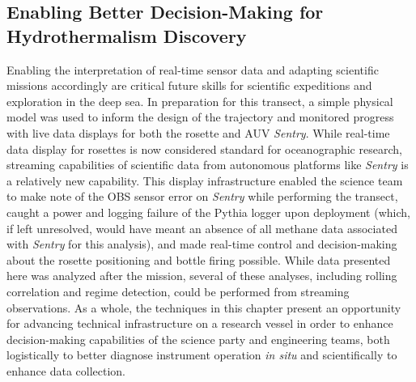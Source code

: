 \subsection{Enabling Better Decision-Making for Hydrothermalism Discovery}
Enabling the interpretation of real-time sensor data and adapting scientific missions accordingly are critical future skills for scientific expeditions and exploration in the deep sea. In preparation for this transect, a simple physical model was used to inform the design of the trajectory and monitored progress with live data displays for both the rosette and AUV \emph{Sentry}. While real-time data display for rosettes is now considered standard for oceanographic research, streaming capabilities of scientific data from autonomous platforms like \emph{Sentry} is a relatively new capability. This display infrastructure enabled the science team to make note of the OBS sensor error on \emph{Sentry} while performing the transect, caught a power and logging failure of the Pythia logger upon deployment (which, if left unresolved, would have meant an absence of all methane data associated with \emph{Sentry} for this analysis), and made real-time control and decision-making about the rosette positioning and bottle firing possible. While data presented here was analyzed after the mission, several of these analyses, including rolling correlation and regime detection, could be performed from streaming observations. As a whole, the techniques in this chapter present an opportunity for advancing technical infrastructure on a research vessel in order to enhance decision-making capabilities of the science party and engineering teams, both logistically to better diagnose instrument operation \emph{in situ} and scientifically to enhance data collection.

